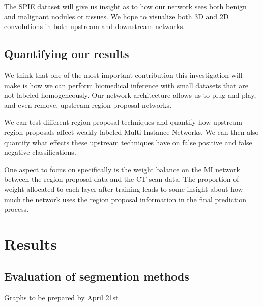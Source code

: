 \documentclass[twocolumn,10pt]{article}
\newcommand{\red}[1]{{\color{red}#1}}
\newcommand{\temp}[1]{{\red{#1}\\}}
\begin{document}
The SPIE dataset will give us insight as to how our network sees both benign
and malignant nodules or tissues. We hope to visualize both 3D and 2D convolutions
in both upstream and downstream networks.

\subsection{Quantifying our results}

We think that one of the most important contribution this investigation will make
is how we can perform biomedical inference with small datasets that are not
labeled homogeneously.
Our network architecture allows us to plug and play, and even remove, upstream
region proposal networks. 

We can test different region proposal techniques and quantify how upstream
region proposals affect weakly labeled Multi-Instance Networks. We can then
also quantify what effects these upstream techniques have on false positive and
false negative classifications.

One aspect to focus on specifically is the weight balance on the MI network
between the region proposal data and the CT scan data. The proportion of
weight allocated to each layer after training leads to some insight about how
much the network uses the region proposal information in the final prediction process.

\section{Results}

\subsection{Evaluation of segmention methods}

\newcommand{\tbox}[1]
{\noindent\fbox{\parbox[c][5cm][c]{\columnwidth}{\begin{center} #1
\end{center}
}
\vspace{0.5cm}
}}

\red{Graphs to be prepared by April 21st}
\end{document}
